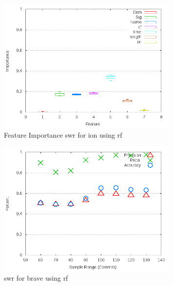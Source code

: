 \begin{figure}[!t]
\centering
\includegraphics[width=0.8\textwidth]{images/rf/test_1/ion_importance.png}
\caption{Feature Importance \gls{swr} for ion using \gls{rf}}
\label{fig:test_1_ion_rf_importance}
\end{figure}

\begin{figure}[!t]
\centering
\includegraphics[width=0.8\textwidth]{images/rf/test_1/brave_sample_range.png}
\caption{\gls{swr} for brave using \gls{rf}}
\label{fig:test_1_brave_rf}
\end{figure}

